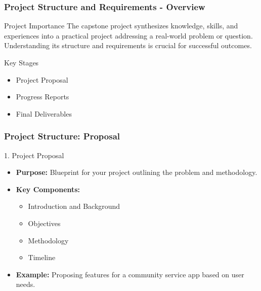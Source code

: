 \documentclass[aspectratio=169]{beamer}
\begin{document}
\begin{frame}[fragile]
    \frametitle{Project Structure and Requirements - Overview}
    \begin{block}{Project Importance}
        The capstone project synthesizes knowledge, skills, and experiences into a practical project addressing a real-world problem or question. Understanding its structure and requirements is crucial for successful outcomes.
    \end{block}
    \begin{block}{Key Stages}
        \begin{itemize}
            \item Project Proposal
            \item Progress Reports
            \item Final Deliverables
        \end{itemize}
    \end{block}
\end{frame}

\begin{frame}[fragile]
    \frametitle{Project Structure: Proposal}
    \begin{block}{1. Project Proposal}
        \begin{itemize}
            \item \textbf{Purpose:} Blueprint for your project outlining the problem and methodology.
            \item \textbf{Key Components:}
                \begin{itemize}
                    \item Introduction and Background
                    \item Objectives
                    \item Methodology
                    \item Timeline
                \end{itemize}
            \item \textbf{Example:} Proposing features for a community service app based on user needs.
        \end{itemize}
    \end{block}
\end{frame}
\end{document}
